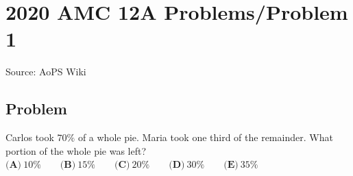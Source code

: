 \documentclass[12pt]{article}
\begin{document}
\section*{{2020 AMC 12A Problems/Problem 1}}
Source: AoPS Wiki

\subsection*{Problem}
Carlos took $70\%$ of a whole pie. Maria took one third of the remainder. What portion of the whole pie was left? $\textbf{(A)}\ 10\%\qquad\textbf{(B)}\ 15\%\qquad\textbf{(C)}\ 20\%\qquad\textbf{(D)}\ 30\%\qquad\textbf{(E)}\ 35\%$
\end{document}
